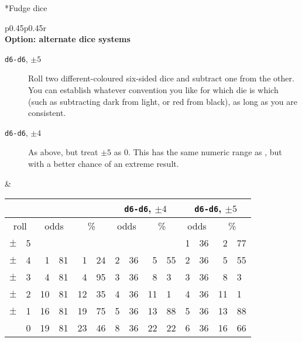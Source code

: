 \begin{sidebox}*{Fudge dice}
\centering
\hspace*{\fill}
\begin{tabular}{p{}p{}r}
 \\
{\medskip\large\bfseries Option: alternate dice systems}
%
\begin{description}
\item [\texttt{d6-d6}, $\pm5$]
Roll two different-coloured six-sided dice and subtract one from the other. You can establish whatever convention you like for which die is which (such as subtracting dark from light, or red from black), as long as you are consistent.

\item [\texttt{d6-d6}, $\pm4$]
As above, but treat $\pm5$ as 0. This has the same numeric range as \dF, but with a better chance of an extreme result.
\end{description}
&
\flushright
\begin{tabular}{r@{}lr@{/}lr@{.}lr@{/}lr@{.}lr@{/}lr@{.}l}
\multicolumn{2}{c}{}
{}	& \multicolumn{4}{c}{\dF}
{}	& \multicolumn{4}{c}{\texttt{d6-d6}, $\pm4$}
{}	& \multicolumn{4}{c}{\texttt{d6-d6}, $\pm5$} \\
\toprule
\multicolumn{2}{c}{roll}
{}	& \multicolumn{2}{c}{odds} & \multicolumn{2}{c}{\%}
{}	& \multicolumn{2}{c}{odds} & \multicolumn{2}{c}{\%}
{}	& \multicolumn{2}{c}{odds} & \multicolumn{2}{c}{\%} \\
\midrule
$\pm$&5	& \multicolumn{8}{c}{}		&  1&36	&  2&77 \\
$\pm$&4	&  1&81	&  1&24	&  2&36	&  5&55	&  2&36	&  5&55 \\
$\pm$&3	&  4&81	&  4&95	&  3&36	&  8&3	&  3&36	&  8&3 \\
$\pm$&2	& 10&81	& 12&35	&  4&36	& 11&1	&  4&36	& 11&1 \\
$\pm$&1	& 16&81	& 19&75	&  5&36	& 13&88	&  5&36	& 13&88 \\
& 0	& 19&81	& 23&46	&  8&36	& 22&22	&  6&36	& 16&66 \\
\bottomrule
\end{tabular}
\end{tabular}
\hspace*{\fill}

\end{sidebox}
